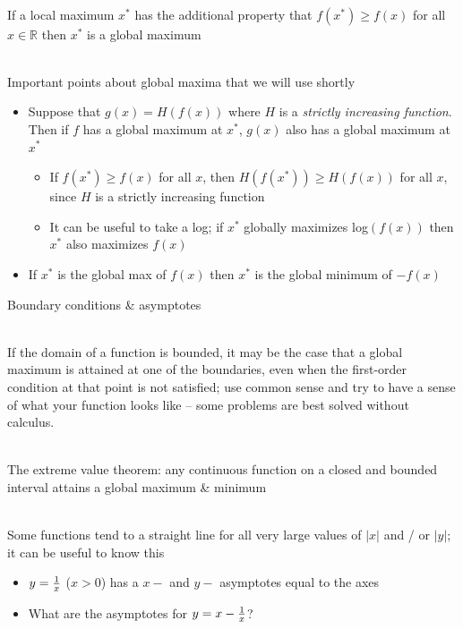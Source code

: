 \documentclass[10pt]{seminar}
\begin{document}
\begin{slide}
\ \\If a local maximum $x^*$ has the additional property that $f(x^*)\geq f(x)$ for all $x\in \mathbb{R}$ then $x^*$ is a global maximum %

\ \\Important points about global maxima that we will use shortly

\begin{itemize}
\item Suppose that $g(x)=H(f(x))$ where $H$ is a \textit{strictly increasing function}.  Then if $f$ has a global maximum at $x^*$, $g(x)$ also has a global maximum at $x^*$
\begin{itemize}
\item If $f(x^*)\geq f(x)$ for all $x$, then $H(f(x^*))\geq H(f(x))$ for all $x$, since $H$ is a strictly increasing function
\item It can be useful to take a log; if $x^*$ globally maximizes log$(f(x))$ then $x^*$ also maximizes $f(x)$
\end{itemize}

\item If $x^*$ is the global max of $f(x)$ then $x^*$ is the global minimum of $-f(x)$
\end{itemize}

\newslide
Boundary conditions \& asymptotes

\ \\ If the domain of a function is bounded, it may be the case that a global maximum is attained at one of the boundaries, even when the first-order condition at that point is not satisfied; use common sense and try to have a sense of what your function looks like -- some problems are best solved without calculus.

\ \\The extreme value theorem:  any continuous function on a closed and bounded interval attains a global maximum \& minimum

\ \\Some functions tend to a straight line for all very large values of $|x|$ and / or  $|y|$; it can be useful to know this

\begin{itemize}
\item $y={1\over x}$ ($x>0$) has a $x-$ and $y-$ asymptotes equal to the axes
\item What are the asymptotes for $y=x-{1\over x}$? %
\end{itemize}


\end{slide}
\end{document}
